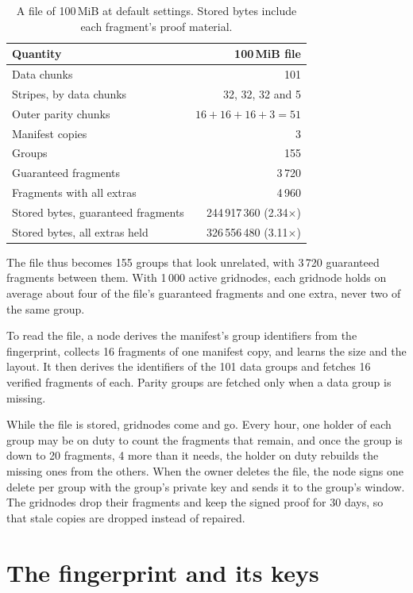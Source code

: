 \documentclass[10pt,a4paper,final]{article}
\begin{document}
\begin{table}[H]
\centering
\small
\begin{tabular}{@{}lr@{}}
\toprule
Quantity & 100\,MiB file \\
\midrule
Data chunks & 101 \\
Stripes, by data chunks & 32, 32, 32 and 5 \\
Outer parity chunks & $16 + 16 + 16 + 3 = 51$ \\
Manifest copies & 3 \\
Groups & 155 \\
Guaranteed fragments & 3\,720 \\
Fragments with all extras & 4\,960 \\
Stored bytes, guaranteed fragments & 244\,917\,360 (2.34$\times$) \\
Stored bytes, all extras held & 326\,556\,480 (3.11$\times$) \\
\bottomrule
\end{tabular}
\caption{A file of 100\,MiB at default settings. Stored bytes include each fragment's proof material.}
\label{tab:life}
\end{table}

The file thus becomes 155 groups that look unrelated, with 3\,720 guaranteed fragments between them. With 1\,000
active gridnodes, each gridnode holds on average about four of the file's guaranteed fragments and one extra, never
two of the same group.

To read the file, a node derives the manifest's group identifiers from the fingerprint, collects 16 fragments of one
manifest copy, and learns the size and the layout. It then derives the identifiers of the 101 data groups and
fetches 16 verified fragments of each. Parity groups are fetched only when a data group is missing.

While the file is stored, gridnodes come and go. Every hour, one holder of each group may be on duty to count the
fragments that remain, and once the group is down to 20 fragments, 4 more than it needs, the holder on duty rebuilds
the missing ones from the others. When the owner deletes the file, the node signs one delete per group with the
group's private key and sends it to the group's window. The gridnodes drop their fragments and keep the signed proof
for 30 days, so that stale copies are dropped instead of repaired.

\section{The fingerprint and its keys}
\label{sec:keys}
\end{document}
